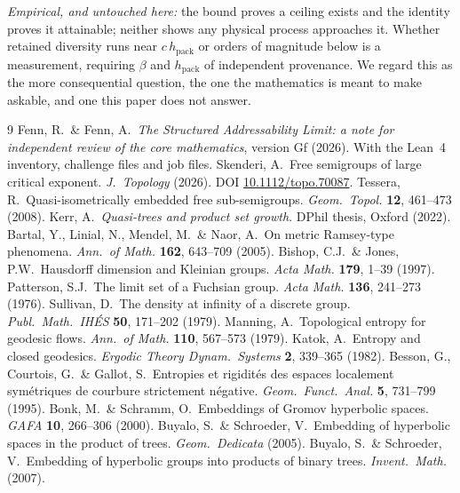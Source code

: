 \documentclass[11pt,reqno]{amsart}
\theoremstyle{plain}
\theoremstyle{definition}
\newcommand{\hpack}{h_{\mathrm{pack}}}
\begin{document}
\emph{Empirical, and untouched here:} the bound proves a ceiling exists and the identity proves it attainable; neither shows any physical process approaches it. Whether retained diversity runs near $c\,\hpack$ or orders of magnitude below is a measurement, requiring $\beta$ and $\hpack$ of independent provenance. We regard this as the more consequential question, the one the mathematics is meant to make askable, and one this paper does not answer.

\begin{thebibliography}{9}\small
{} Fenn, R.\ \& Fenn, A.\ \emph{The Structured Addressability Limit: a note for independent review of the core mathematics}, version Gf (2026). With the Lean~4 inventory, challenge files and job files.
 Skenderi, A.\ Free semigroups of large critical exponent. \emph{J.\ Topology} (2026). DOI \href{https://doi.org/10.1112/topo.70087}{10.1112/topo.70087}.
 Tessera, R.\ Quasi-isometrically embedded free sub-semigroups. \emph{Geom.\ Topol.} \textbf{12}, 461--473 (2008).
 Kerr, A.\ \emph{Quasi-trees and product set growth}. DPhil thesis, Oxford (2022).
 Bartal, Y., Linial, N., Mendel, M.\ \& Naor, A.\ On metric Ramsey-type phenomena. \emph{Ann.\ of Math.} \textbf{162}, 643--709 (2005).
 Bishop, C.J.\ \& Jones, P.W.\ Hausdorff dimension and Kleinian groups. \emph{Acta Math.} \textbf{179}, 1--39 (1997).
 Patterson, S.J.\ The limit set of a Fuchsian group. \emph{Acta Math.} \textbf{136}, 241--273 (1976).
 Sullivan, D.\ The density at infinity of a discrete group. \emph{Publ.\ Math.\ IH\'ES} \textbf{50}, 171--202 (1979).
 Manning, A.\ Topological entropy for geodesic flows. \emph{Ann.\ of Math.} \textbf{110}, 567--573 (1979).
 Katok, A.\ Entropy and closed geodesics. \emph{Ergodic Theory Dynam.\ Systems} \textbf{2}, 339--365 (1982).
 Besson, G., Courtois, G.\ \& Gallot, S.\ Entropies et rigidit\'es des espaces localement sym\'etriques de courbure strictement n\'egative. \emph{Geom.\ Funct.\ Anal.} \textbf{5}, 731--799 (1995).
 Bonk, M.\ \& Schramm, O.\ Embeddings of Gromov hyperbolic spaces. \emph{GAFA} \textbf{10}, 266--306 (2000).
 Buyalo, S.\ \& Schroeder, V.\ Embedding of hyperbolic spaces in the product of trees. \emph{Geom.\ Dedicata} (2005).
 Buyalo, S.\ \& Schroeder, V.\ Embedding of hyperbolic groups into products of binary trees. \emph{Invent.\ Math.} (2007).

\end{thebibliography}
\end{document}
